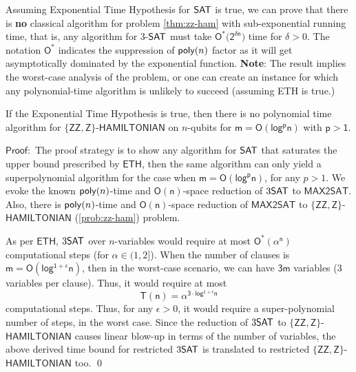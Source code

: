 \documentclass[11pt]{article}
\begin{document}
Assuming Exponential Time Hypothesis for $\mathsf{SAT}$ is true, we can prove that there is \textbf{no} classical algorithm for problem \ref{thm:zz-ham} with sub-exponential running time, that is, any algorithm for $3$-$\mathsf{SAT}$ must take $\mathsf{O^{*}(2^{\delta n}})$ time for $\delta>0$. The notation $\mathsf{O^{*}}$ indicates the suppression of $\mathsf{poly}(n)$ factor as it will get asymptotically dominated by the exponential function. \textbf{Note}: The result implies the worst-case analysis of the problem, or one can create an instance for which any polynomial-time algorithm is unlikely to succeed (assuming ETH is true.) 
\begin{theorem}
    If the Exponential Time Hypothesis is true, then there is no polynomial time algorithm for $\mathsf{\{ZZ,Z\}}$-$\mathsf{HAMILTONIAN}$  on $n$-qubits for $\mathsf{m=O(log^p n)}$ with $\mathsf{p>1}$. \label{thm:ETH}
\end{theorem}
$\mathsf{Proof:}$ The proof strategy is to show any algorithm for $\mathsf{SAT}$ that saturates the upper bound prescribed by $\mathsf{ETH}$, then the same algorithm can only yield a superpolynomial algorithm for the case when $\mathsf{m=O(log^{p} n)}$, for any $p>1$. We evoke the known $\mathsf{poly}(n)$-time and $\mathsf{O(n)}$-space reduction of $3\mathsf{SAT}$ to $\mathsf{MAX2SAT}$. Also, there is  $\mathsf{poly}(n)$-time and $\mathsf{O(n)}$-space reduction of $\mathsf{MAX2SAT}$ to $\mathsf{\{ZZ,Z\}}$-$\mathsf{HAMILTONIAN}$ (\ref{prob:zz-ham})  problem. \par
As per $\mathsf{ETH}$, $3\mathsf{SAT}$ over $n$-variables would require at most $\mathsf{O^{*}(\alpha^{n})}$ computational steps (for $\alpha \in (1,2]$). When the number of clauses is $\mathsf{m=O(log^{1+\epsilon} n)}$, then in the worst-case scenario, we can have $\mathsf{3m}$ variables (3 variables per clause). Thus, it would require at most 
\begin{equation}
    \mathsf{T(n)=\alpha^{3 \cdot log^{1+\epsilon} n}}
\end{equation}
computational steps. Thus, for any $\epsilon>0$, it would require a super-polynomial number of steps, in the worst case. Since the reduction of $3\mathsf{SAT}$ to $\mathsf{\{ZZ, Z\}}$-$\mathsf{HAMILTONIAN}$  causes linear blow-up in terms of the number of variables, the above derived time bound for restricted $3\mathsf{SAT}$ is translated to restricted $\mathsf{\{ZZ,  Z\}}$-$\mathsf{HAMILTONIAN}$ too. 
\qed
\end{document}
